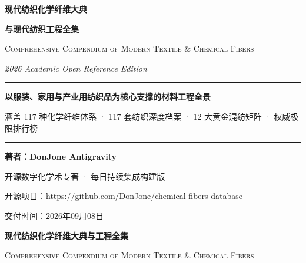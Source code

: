 \documentclass[11pt,openright,twoside,UTF8]{ctexbook}
\begin{document}
\begin{titlepage}
\centering
\vspace*{2.5cm}
{\Huge\bfseries\color{themeblue} 现代纺织化学纤维大典\par}
\vspace{0.6cm}
{\LARGE\bfseries 与现代纺织工程全集\par}
\vspace{1.2cm}
{\Large\scshape Comprehensive Compendium of Modern Textile \& Chemical Fibers\par}
\vspace{0.4cm}
{\large\itshape 2026 Academic Open Reference Edition\par}

\vspace{2.2cm}
\rule{0.75\textwidth}{0.8pt}\par
\vspace{0.5cm}
{\large\bfseries 以服装、家用与产业用纺织品为核心支撑的材料工程全景\par}
\vspace{0.3cm}
{\normalsize 涵盖 117 种化学纤维体系 · 117 套纺织深度档案 · 12 大黄金混纺矩阵 · 权威极限排行榜\par}
\vspace{0.5cm}
\rule{0.75\textwidth}{0.8pt}\par

\vfill
{\Large\bfseries 著\quad 者：DonJone \quad Antigravity\par}
\vspace{0.4cm}
{\normalsize 开源数字化学术专著 · 每日持续集成构建版\par}
\vspace{0.2cm}
{\small 开源项目：\url{https://github.com/DonJone/chemical-fibers-database}\par}
\vspace{0.2cm}
{\small 交付时间：2026年09月08日\par}
\vspace{1.5cm}
\end{titlepage}

\frontmatter

\newpage
\thispagestyle{empty}
\vspace*{1.2cm}

\begin{center}
{\LARGE\bfseries 现代纺织化学纤维大典与工程全集}\par
\vspace{0.2cm}
{\small\scshape Comprehensive Compendium of Modern Textile \& Chemical Fibers}
\end{center}
\end{document}
